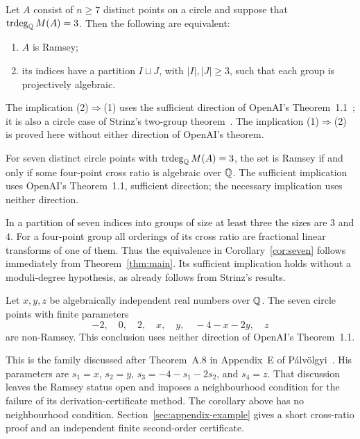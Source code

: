 \begin{maintheorem}\label{thm:main}
Let $A$ consist of $n\ge7$ distinct points on a circle and suppose that
$\operatorname{trdeg}_\mathbb Q M(A)=3$. Then the following are equivalent:
\begin{enumerate}
\item $A$ is Ramsey;
\item its indices have a partition $I\sqcup J$, with $|I|,|J|\ge3$,
such that each group is projectively algebraic.
\end{enumerate}
The implication \textup{(2)}$\Rightarrow$\textup{(1)} uses the sufficient
direction of OpenAI's Theorem~1.1~\cite{openai2026}; it is also a circle
case of Strinz's two-group theorem~\cite[Theorem C2]{strinz2026spherical}.
The implication \textup{(1)}$\Rightarrow$\textup{(2)} is proved here
without either direction of OpenAI's theorem.
\end{maintheorem}

\begin{maincorollary}\label{cor:seven}
For seven distinct circle points with $\operatorname{trdeg}_\mathbb Q M(A)=3$, the set is
Ramsey if and only if some four-point cross ratio is algebraic over $\mathbb Q$.
The sufficient implication uses OpenAI's Theorem~1.1, sufficient
direction; the necessary implication uses neither direction.
\end{maincorollary}

In a partition of seven indices into groups of size at least three the
sizes are $3$ and $4$. For a four-point group all orderings of its cross
ratio are fractional linear transforms of one of them. Thus the
equivalence in Corollary~\ref{cor:seven} follows immediately from
Theorem~\ref{thm:main}. Its sufficient implication holds without a
moduli-degree hypothesis, as already follows from Strinz's results.

\begin{maincorollary}\label{cor:palvolgyi}
Let $x,y,z$ be algebraically independent real numbers over $\mathbb Q$. The
seven circle points with finite parameters
\begin{equation}\label{eq:appendix-family}
 -2,\quad 0,\quad 2,\quad x,\quad y,\quad -4-x-2y,\quad z
\end{equation}
are non-Ramsey. This conclusion uses neither direction of OpenAI's
Theorem~1.1.
\end{maincorollary}

This is the family discussed after Theorem~A.8 in Appendix~E of
P\'alv\"olgyi~\cite{palvolgyi2026}. His parameters are
$s_1=x$, $s_2=y$, $s_3=-4-s_1-2s_2$, and $s_4=z$. That discussion
leaves the Ramsey status open and imposes a neighbourhood condition for
the failure of its derivation-certificate method. The corollary above
has no neighbourhood condition. Section~\ref{sec:appendix-example}
gives a short cross-ratio proof and an independent finite second-order
certificate.

